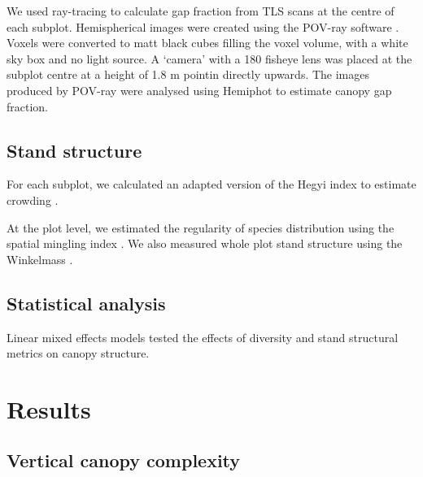 \documentclass[11pt,a4paper]{article}
\begin{document}
We used ray-tracing to calculate gap fraction from TLS scans at the centre of each subplot. Hemispherical images were created using the POV-ray software \citep{}. Voxels were converted to matt black cubes filling the voxel volume, with a white sky box and no light source. A `camera' with a 180\textdegree{} fisheye lens was placed at the subplot centre at a height of 1.8 m pointin directly upwards. The images produced by POV-ray were analysed using Hemiphot \citep{Steege} to estimate canopy gap fraction.

\subsection{Stand structure}

For each subplot, we calculated an adapted version of the Hegyi index to estimate crowding \citep{Hegyi1974}.

At the plot level, we estimated the regularity of species distribution using the spatial mingling index \citep{Gadow}. We also measured whole plot stand structure using the Winkelmass \citep{}.

\subsection{Statistical analysis}

Linear mixed effects models tested the effects of diversity and stand structural metrics on canopy structure.

\section{Results}

\subsection{Vertical canopy complexity}
\end{document}
